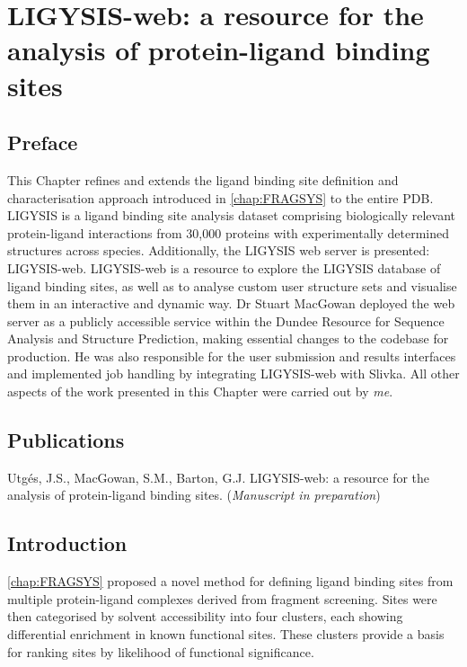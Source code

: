 \chapter{LIGYSIS-web: a resource for the analysis of protein-ligand binding sites}
\label{chap:LIGYSIS_WEB}

\section*{Preface}

This Chapter refines and extends the ligand binding site definition and characterisation approach introduced in \autoref{chap:FRAGSYS} to the entire PDB. LIGYSIS is a ligand binding site analysis dataset comprising biologically relevant protein-ligand interactions from 30,000 proteins with experimentally determined structures across species. Additionally, the LIGYSIS web server is presented: LIGYSIS-web. LIGYSIS-web is a resource to explore the LIGYSIS database of ligand binding sites, as well as to analyse custom user structure sets and visualise them in an interactive and dynamic way. Dr Stuart MacGowan deployed the web server as a publicly accessible service within the Dundee Resource for Sequence Analysis and Structure Prediction, making essential changes to the codebase for production. He was also responsible for the user submission and results interfaces and implemented job handling by integrating LIGYSIS-web with Slivka. All other aspects of the work presented in this Chapter were carried out by \textit{me}.

\section*{Publications}

Utgés, J.S., MacGowan, S.M., Barton, G.J. LIGYSIS-web: a resource for the analysis of protein-ligand binding sites. (\textit{Manuscript in preparation})

\section{Introduction}

\autoref{chap:FRAGSYS} proposed a novel method for defining ligand binding sites from multiple protein-ligand complexes derived from fragment screening. Sites were then categorised by solvent accessibility into four clusters, each showing differential enrichment in known functional sites. These clusters provide a basis for ranking sites by likelihood of functional significance.

